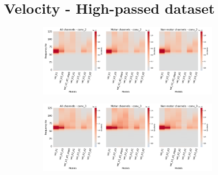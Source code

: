 \section*{Velocity - High-passed dataset}\label{subsec:vel-high-passed-dataset-appendixB}
\begin{figure}[!htpb]
\centering
\begin{subfigure}[b]{\textwidth}
   \includegraphics[width=1\linewidth]{img/appendix/A/conv-2/hp-sm/vel-model-gradients_all_kinds}
   \caption{}
   \label{fig:vel-hp-shifted-grads-conv-2}
\end{subfigure}

\begin{subfigure}[b]{\textwidth}
   \includegraphics[width=1\linewidth]{img/appendix/A/conv-3/hp-sm/vel-model-gradients_all_kinds}
   \caption{}
   \label{fig:vel-hp-shifted-grads-conv-3}
\end{subfigure}

\end{figure}
\clearpage   

